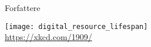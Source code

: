 \cleardoublepage
\begin{titlepage}
	\centering
	\vspace{3cm}
	{\Huge Forfattere \par} \vspace{0.5cm}
	{\texttt{[image: digital\_resource\_lifespan]}\\
		\tiny \url{https://xkcd.com/1909/} \par} \vspace{0.5cm}	
\end{titlepage}
